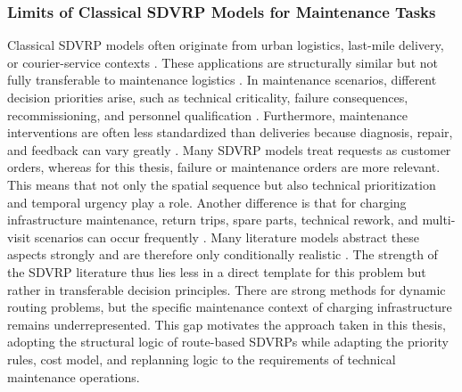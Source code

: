 \documentclass[12pt,oneside]{article}
\begin{document}
\subsubsection{Limits of Classical SDVRP Models for Maintenance Tasks}
Classical SDVRP models often originate from urban logistics, last-mile delivery, or courier-service contexts \citep{mardevsic2023review}. These applications are structurally similar but not fully transferable to maintenance logistics \citep{abbatecola2016review}. In maintenance scenarios, different decision priorities arise, such as technical criticality, failure consequences, recommissioning, and personnel qualification \citep{mardevsic2023review}.
Furthermore, maintenance interventions are often less standardized than deliveries because diagnosis, repair, and feedback can vary greatly \citep{abbatecola2016review}. Many SDVRP models treat requests as customer orders, whereas for this thesis, failure or maintenance orders are more relevant. This means that not only the spatial sequence but also technical prioritization and temporal urgency play a role.
Another difference is that for charging infrastructure maintenance, return trips, spare parts, technical rework, and multi-visit scenarios can occur frequently \citep{abbatecola2016review}. Many literature models abstract these aspects strongly and are therefore only conditionally realistic \citep{ritzinger2016survey}.
The strength of the SDVRP literature thus lies less in a direct template for this problem but rather in transferable decision principles. There are strong methods for dynamic routing problems, but the specific maintenance context of charging infrastructure remains underrepresented. This gap motivates the approach taken in this thesis, adopting the structural logic of route-based SDVRPs while adapting the priority rules, cost model, and replanning logic to the requirements of technical maintenance operations.
\end{document}
